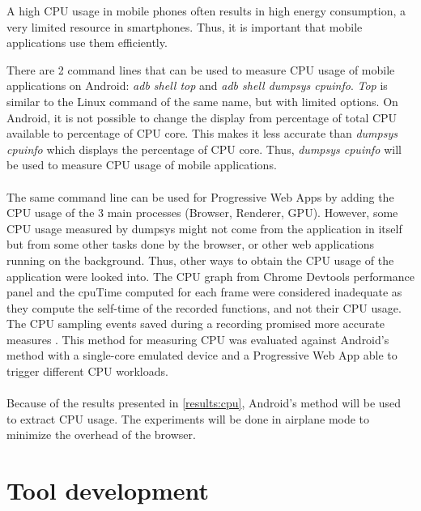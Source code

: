 \documentclass{kththesis}
\begin{document}
A high CPU usage in mobile phones often results in high energy consumption, a very limited resource in smartphones. Thus, it is important that mobile applications use them efficiently.

There are 2 command lines that can be used to measure CPU usage of mobile applications on Android: \textit{adb shell top} and \textit{adb shell dumpsys cpuinfo}. \textit{Top} is similar to the Linux command of the same name, but with limited options. On Android, it is not possible to change the display from percentage of total CPU available to percentage of CPU core. This makes it less accurate than \textit{dumpsys cpuinfo} which displays the percentage of CPU core. Thus, \textit{dumpsys cpuinfo} will be used to measure CPU usage of mobile applications. 

\paragraph{}
The same command line can be used for Progressive Web Apps by adding the CPU usage of the 3 main processes (Browser, Renderer, GPU). 
However, some CPU usage measured by dumpsys might not come from the application in itself but from some other tasks done by the browser, or other web applications running on the background. 
Thus, other ways to obtain the CPU usage of the application were looked into.
The CPU graph from Chrome Devtools performance panel and the cpuTime computed for each frame were considered inadequate as they compute the self-time of the recorded functions, and not their CPU usage. The CPU sampling events saved during a recording promised more accurate measures \cite{cpu_sampling}. This method for measuring CPU was evaluated against Android's method with a single-core emulated device and a Progressive Web App able to trigger different CPU workloads. \newline

\paragraph{}
Because of the results presented in \autoref{results:cpu}, Android's method will be used to extract CPU usage. The experiments will be done in airplane mode to minimize the overhead of the browser. 

\section{Tool development}
\end{document}
